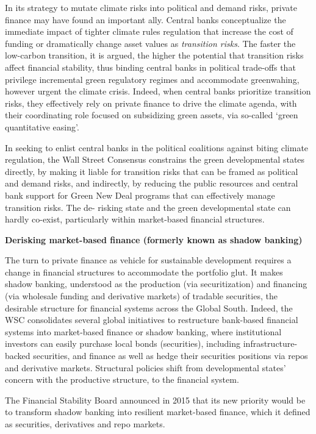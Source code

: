 \documentclass[
]{book}
\begin{document}
In its strategy to mutate climate risks into political and demand risks, private finance
may have found an important ally. Central banks conceptualize the immediate impact
of tighter climate rules regulation that increase the cost of funding or dramatically
change asset values as \emph{transition risks}.
The faster the low-carbon
transition, it is argued, the higher the potential that transition risks affect financial
stability, thus binding central banks in political trade-offs that privilege incremental
green regulatory regimes and accommodate greenwahing, however urgent the climate
crisis. Indeed, when central banks prioritize transition risks, they effectively rely on
private finance to drive the climate agenda, with their coordinating role focused on
subsidizing green assets, via so-called `green quantitative easing'.

In seeking to enlist central banks in the political coalitions against biting climate
regulation, the Wall Street Consensus constrains the green developmental states
directly, by making it liable for transition risks that can be framed as political and
demand risks, and indirectly, by reducing the public resources and central bank support
for Green New Deal programs that can effectively manage transition risks. The de-
risking state and the green developmental state can hardly co-exist, particularly within
market-based financial structures.

\textbf{Derisking market-based finance (formerly known as shadow banking)}

The turn to private finance as vehicle for sustainable development requires a change in
financial structures to accommodate the portfolio glut. It makes shadow banking,
understood as the production (via securitization) and financing (via wholesale funding
and derivative markets) of tradable securities, the desirable structure for financial
systems across the Global South. Indeed, the WSC consolidates
several global initiatives to restructure bank-based financial systems into market-based
finance or shadow banking,
where institutional investors can easily purchase local bonds (securities), including
infrastructure-backed securities, and finance as well as hedge their securities positions
via repos and derivative markets. Structural policies shift from developmental states'
concern with the productive structure, to the financial system.

The Financial Stability Board announced in 2015 that its new priority would be to transform
shadow banking into resilient market-based finance, which it defined as securities,
derivatives and repo markets.
\end{document}
